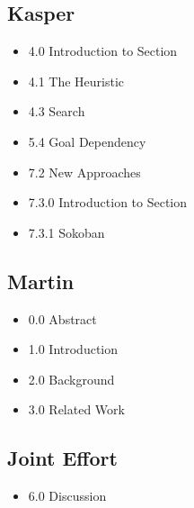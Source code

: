 \documentclass[10pt,a4paper]{article}
\begin{document}
	\subsection{Kasper}
		\begin{itemize}
			\item 4.0 Introduction to Section
			\item 4.1 The Heuristic
			\item 4.3 Search
			\item 5.4 Goal Dependency
			\item 7.2 New Approaches
			\item 7.3.0 Introduction to Section
			\item 7.3.1 Sokoban
		\end{itemize}
	\subsection{Martin}
		\begin{itemize}
			\item 0.0 Abstract
			\item 1.0 Introduction
			\item 2.0 Background
			\item 3.0 Related Work
		\end{itemize}

	\subsection{Joint Effort}
		\begin{itemize}
			\item 6.0 Discussion
		\end{itemize}
\end{document}
